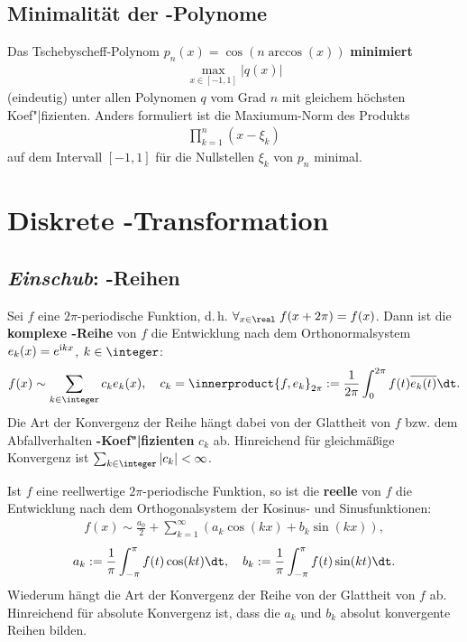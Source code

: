 \subsection{%
    Minimalität der -Polynome%
}

Das Tschebyscheff-Polynom $p_n(x) = \cos(n \arccos(x))$ \textbf{minimiert}
\begin{align*}
    \max_{x \in [-1,1]} |q(x)|
\end{align*}
(eindeutig) unter allen Polynomen $q$ vom Grad $n$ mit gleichem höchsten
Koef"|fizienten.
Anders formuliert ist die Maxiumum-Norm des Produkts
\begin{align*}
    \prod_{k=1}^n (x - \xi_k)
\end{align*}
auf dem Intervall $[-1,1]$ für die Nullstellen $\xi_k$ von $p_n$ minimal.

\pagebreak

\section{%
    Diskrete -Transformation%
}

\subsection{%
    \emph{Einschub}: -Reihen%
}

Sei $f$ eine $2\pi$-periodische Funktion, d.\,h.
$\forall_{x \in \real}\; f(x + 2\pi) = f(x)$.
Dann ist die \textbf{komplexe -Reihe} von $f$ die Entwicklung
nach dem Orthonormalsystem $e_k(x) = e^{\mathrm{i} kx}$, $k \in \integer$:
\begin{align*}
    f(x) \sim \sum_{k \in \integer} c_k e_k(x), \quad
    c_k = \innerproduct{f, e_k}_{2\pi} :=
    \frac{1}{2\pi} \int_0^{2\pi} f(t) \overline{e_k(t)} \dt.
\end{align*}
Die Art der Konvergenz der Reihe hängt dabei von der Glattheit von $f$ bzw.
dem Abfallverhalten \textbf{-Koef"|fizienten} $c_k$ ab.
Hinreichend für gleichmäßige Konvergenz ist
$\sum_{k \in \integer} |c_k| < \infty$.

\linie

Ist $f$ eine reellwertige $2\pi$-periodische Funktion, so ist die
\textbf{reelle } von $f$ die Entwicklung nach dem
Orthogonalsystem der Kosinus- und Sinusfunktionen:
\begin{align*}
    f(x) \sim \frac{a_0}{2} + \sum_{k=1}^\infty (a_k \cos(kx) + b_k \sin(kx)),
\end{align*}
\begin{align*}
    a_k := \frac{1}{\pi} \int_{-\pi}^\pi f(t) \cos(kt) \dt, \quad
    b_k := \frac{1}{\pi} \int_{-\pi}^\pi f(t) \sin(kt) \dt.
\end{align*}
Wiederum hängt die Art der Konvergenz der Reihe von der Glattheit von $f$ ab.
Hinreichend für absolute Konvergenz ist, dass die
 $a_k$ und $b_k$ absolut konvergente
Reihen bilden.

